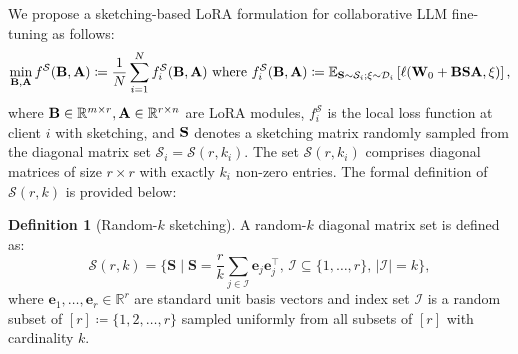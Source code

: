 \documentclass{article} %
\theoremstyle{plain}
\theoremstyle{definition}
\newtheorem{definition}[theorem]{Definition}
\newcommand{\eqdef}{\coloneqq}
\begin{document}
We propose a sketching-based LoRA formulation for collaborative LLM fine-tuning as follows: 
\vspace{-0.05in}
\begin{equation}\label{lora_formulation_ours}
\begin{aligned}
\min_{{\bf B},{\bf A}} f^{\mathcal{S}}({\bf B},{\bf A}) \eqdef  \frac{1}{N} \sum_{i=1}^N f_i^{\mathcal{S}} ({\bf B},{\bf A}) ~\text{where}~
f_i^{\mathcal{S}}({\bf B},{\bf A}) \eqdef  \mathbb{E}_{ {\bf S} \sim \mathcal{S}_i; \xi \sim \mathcal{D}_i} \left[ \ell ({\bf W}_{0} + {\bf B}\bf S{\bf A}, \xi)\right],
\end{aligned}
\end{equation}
where ${\bf B} \in \mathbb{R}^{m\times r},  {\bf A}\in \mathbb{R}^{r\times n}$ are LoRA modules, $f_i^{\mathcal{S}}$ is the local loss function at client $i$ with sketching, and \({\bf S}\) denotes a sketching matrix randomly sampled from the diagonal matrix set \(\mathcal{S}_i = \mathcal{S}(r, k_i)\). The set \(\mathcal{S}(r, k_i)\) comprises diagonal matrices of size \(r \times r\) with exactly \(k_i\) non-zero entries. 
The formal definition of \(\mathcal{S}(r, k)\) is provided below:
\begin{definition}[Random-$k$ sketching]\label{skeching_def}
A random-$k$ diagonal matrix set is defined as:  
\[
\mathcal{S}(r, k) \!=\! \Bigg \{ \! \mathbf{S} \!\mid \! \mathbf{S} \!=\! \frac{r}{k} \! \sum_{j \in \mathcal{I}} \! \mathbf{e}_j \mathbf{e}_j^\top, \, \mathcal{I} \subseteq \{1, \ldots, r\}, \, |\mathcal{I}| \!=\! k \Bigg \},
\]  
where \(\mathbf{e}_1, \dots, \mathbf{e}_r \in \mathbb{R}^r\) are standard unit basis vectors and index set \(\mathcal{I}\) is a random subset of \([r] \eqdef \{1,2,\ldots, r\} \) sampled uniformly from all subsets of \([r]\) with cardinality \(k\).
\end{definition}
\end{document}
